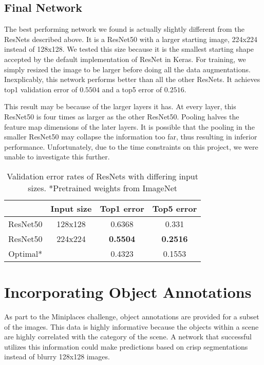 \documentclass[10pt,twocolumn,letterpaper]{article}
\begin{document}
\subsection{Final Network}
The best performing network we found is actually slightly different from the ResNets described above. It is a ResNet50 with a larger starting image, 224x224 instead of 128x128. We tested this size because it is the smallest starting shape accepted by the default implementation of ResNet in Keras. For training, we simply resized the image to be larger before doing all the data augmentations. Inexplicably, this network performs better than all the other ResNets. It achieves top1 validation error of $0.5504$ and a top5 error of $0.2516$.

 This result may be because of the larger layers it has. At every layer, this ResNet50 is four times as larger as the other ResNet50. Pooling halves the feature map dimensions of the later layers. It is possible that the pooling in the smaller ResNet50 may collapse the information too far, thus resulting in inferior performance. Unfortunately, due to the time constraints on this project, we were unable to investigate this further.

\begin{table}[h]
\centering
 \begin{tabular}{||c c c c||} 
 \hline
  & Input size & Top1 error & Top5 error \\ [0.5ex] 
 \hline\hline
  ResNet50 & 128x128 & 0.6368 & 0.331 \\ [1ex] 
 \hline
 ResNet50 & 224x224 & \bf{0.5504} & \bf{0.2516} \\ [1ex] 
 \hline
 Optimal* &  & 0.4323 & 0.1553 \\ [1ex] 
 \hline
\end{tabular}
\smallskip
\caption{Validation error rates of ResNets with differing input sizes. *Pretrained weights from ImageNet
}

\label{table:1}
\end{table}

\section{Incorporating Object Annotations}
As part to the Miniplaces challenge, object annotations are provided for a subset of the images. This data is highly informative because the objects within a scene are highly correlated with the category of the scene. A network that successful utilizes this information could make predictions based on crisp segmentations instead of blurry 128x128 images.
\end{document}
